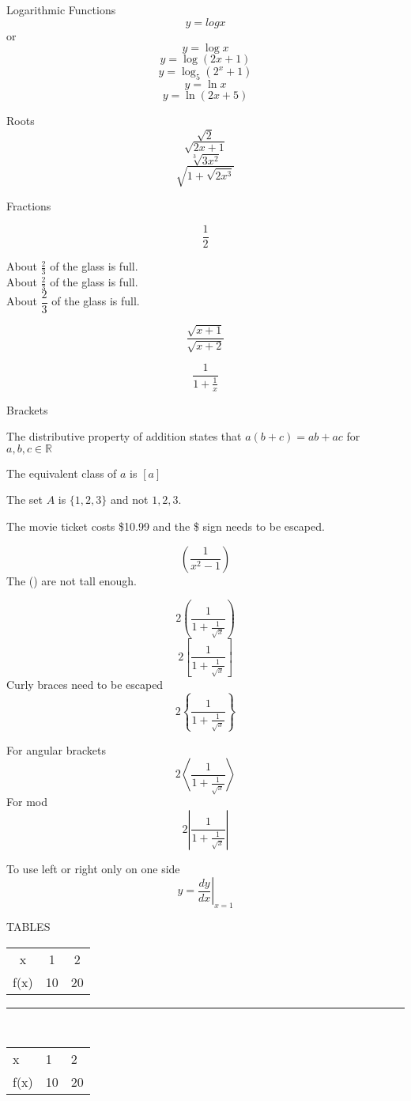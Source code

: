 \documentclass[11pt]{article}
\begin{document}
Logarithmic Functions
$$ y = log x $$ 
or
$$ y = \log x $$
$$ y = \log {(2x+1)} $$
$$ y = \log_5 {(2^x+1)} $$
$$ y = \ln x $$
$$ y = \ln {(2x+5)} $$

Roots
$$ \sqrt{2} $$
$$ \sqrt{2x+1} $$
$$ \sqrt[3]{3x^2} $$
$$ \sqrt{1+\sqrt{2x^3}} $$

Fractions

$$ \frac{1}{2} $$

About $\frac{2}{3}$ of the glass is full.
\\[0.5cm]
About $\displaystyle\frac{2}{3}$ of the glass is full.
\\[0.25cm]
About $\dfrac{2}{3}$ of the glass is full.

$$ \frac{\sqrt{x+1}}{\sqrt{x+2}} $$

$$ \frac{1}{1+\frac{1}{x}} $$

\vspace{1cm}
Brackets

The distributive property of addition states that $a(b+c)=ab+ac$ for $a, b, c \in \mathbb{R}$

The equivalent class of $ a $ is $[a]$

The set $ A $ is $\{1, 2, 3\}$ and not ${1, 2, 3}$.

The movie ticket costs \$10.99 and the \$ sign needs to be escaped.

$$ (\frac{1}{x^2-1}) $$
The () are not tall enough.

$$ 2\left( \frac{1}{1+\frac{1}{\sqrt{x}}}  \right) $$
$$ 2\left[ \frac{1}{1+\frac{1}{\sqrt{x}}}  \right] $$
Curly braces need to be escaped 
$$ 2\left\{ \frac{1}{1+\frac{1}{\sqrt{x}}}  \right\} $$

For angular brackets
$$ 2\left\langle \frac{1}{1+\frac{1}{\sqrt{x}}}  \right\rangle $$
For mod
$$ 2\left| \frac{1}{1+\frac{1}{\sqrt{x}}}  \right| $$

To use left or right only on one side
$$  y =  \left.\frac{dy}{dx}\right|_{x=1} $$

TABLES
\\[12pt]
\begin{tabular}{c|c|c} %
    x & 1 & 2 \\
    f(x) & 10 & 20
\end{tabular}

\rule{\textwidth}{0.5pt}
\\[12pt]
\begin{tabular}{l|l|l} %
    x & 1 & 2 \\
    f(x) & 10 & 20
\end{tabular}
\end{document}
